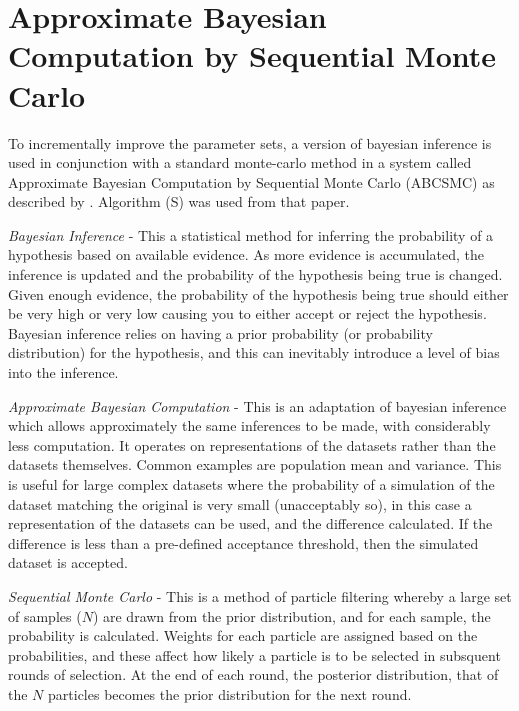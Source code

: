 \section{Approximate Bayesian Computation by Sequential Monte Carlo}

To incrementally improve the parameter sets, a version of bayesian inference is used in conjunction with a standard monte-carlo method in a system called Approximate Bayesian Computation by Sequential Monte Carlo (ABCSMC) as described by \citet{Toni2009}. Algorithm (S) was used from that paper.

\textit{Bayesian Inference} - This a statistical method for inferring the probability of a hypothesis based on available evidence. As more evidence is accumulated, the inference is updated and the probability of the hypothesis being true is changed. Given enough evidence, the probability of the hypothesis being true should either be very high or very low causing you to either accept or reject the hypothesis. Bayesian inference relies on having a prior probability (or probability distribution) for the hypothesis, and this can inevitably introduce a level of bias into the inference.

\textit{Approximate Bayesian Computation} - This is an adaptation of bayesian inference which allows approximately the same inferences to be made, with considerably less computation. It operates on representations of the datasets rather than the datasets themselves. Common examples are population mean and variance. This is useful for large complex datasets where the probability of a simulation of the dataset matching the original is very small (unacceptably so), in this case a representation of the datasets can be used, and the difference calculated. If the difference is less than a pre-defined acceptance threshold, then the simulated dataset is accepted.

\textit{Sequential Monte Carlo} - This is a method of particle filtering whereby a large set of samples ($N$) are drawn from the prior distribution, and for each sample, the probability is calculated. Weights for each particle are assigned based on the probabilities, and these affect how likely a particle is to be selected in subsquent rounds of selection. At the end of each round, the posterior distribution, that of the $N$ particles becomes the prior distribution for the next round.


